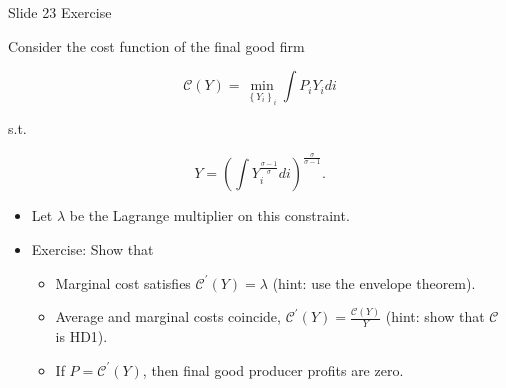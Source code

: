 Slide 23 Exercise

Consider the cost function of the final good firm

$$
\mathcal{C}(Y)=\min _{\left\{Y_i\right\}_i} \int P_i Y_i d i
$$

s.t.

$$
Y=\left(\int Y_i^{\frac{\sigma-1}{\sigma}} d i\right)^{\frac{\sigma}{\sigma-1}} .
$$

\begin{itemize}
    \item Let $\lambda$ be the Lagrange multiplier on this constraint.
    \item Exercise: Show that
    \begin{itemize}
      \item Marginal cost satisfies $\mathcal{C}^{\prime}(Y) = \lambda$ (hint: use the envelope theorem).
      \item Average and marginal costs coincide, $\mathcal{C}^{\prime}(Y) = \frac{\mathcal{C}(Y)}{Y}$ (hint: show that $\mathcal{C}$ is HD1).
      \item If $P = \mathcal{C}^{\prime}(Y)$, then final good producer profits are zero.
    \end{itemize}
  \end{itemize}
  
